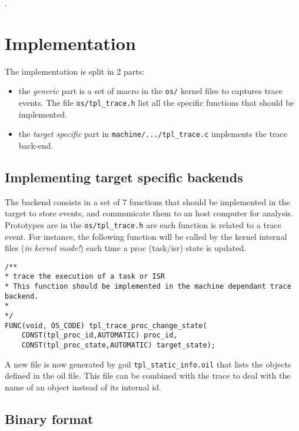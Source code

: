 .

\section{Implementation}
The implementation is split in 2 parts:
\begin{itemize}
	\item the \emph{generic} part is a set of macro in the \texttt{os/} kernel files to captures trace events. The file \texttt{os/tpl_trace.h} list all the specific functions that should be implemented.
	\item the \emph{target specific} part in \lstinline{machine/.../tpl_trace.c} implements the trace back-end. 
\end{itemize}

\subsection{Implementing target specific backends}
\label{sec:trace:targetbackend}

The backend consists in a set of 7 functions that should be implemented in the target to store events, and communicate them to an host computer for analysis. Prototypes are in the \texttt{os/tpl_trace.h} are each function is related to a trace event. For instance, the following function will be called by the kernel internal files (\emph{in kernel mode!}) each time a proc (task/isr) state is updated.

\begin{lstlisting}
/**
* trace the execution of a task or ISR
* This function should be implemented in the machine dependant trace backend.
*
*/
FUNC(void, OS_CODE) tpl_trace_proc_change_state(
    CONST(tpl_proc_id,AUTOMATIC) proc_id,
    CONST(tpl_proc_state,AUTOMATIC) target_state);
\end{lstlisting}

A new file is now generated by goil \texttt{tpl_static_info.oil} that lists the objects defined in the oil file. This file can be combined with the trace to deal with the name of an object instead of its internal id.


\subsection{Binary format}
\label{sec:traceBinFormat}

